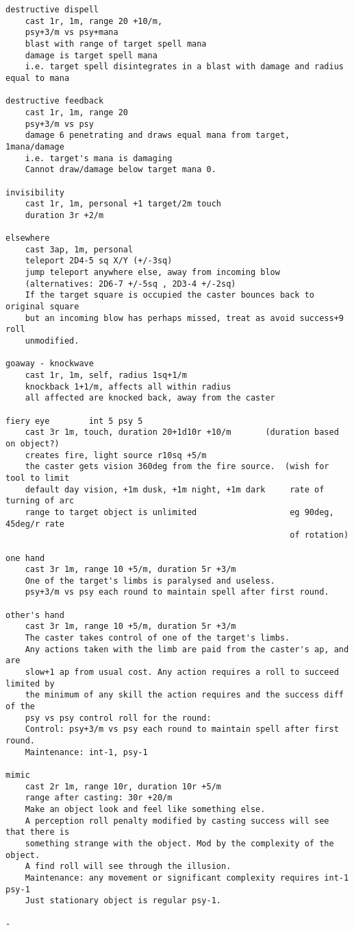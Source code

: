 \small \begin{verbatim}
destructive dispell
    cast 1r, 1m, range 20 +10/m, 
    psy+3/m vs psy+mana
    blast with range of target spell mana
    damage is target spell mana
    i.e. target spell disintegrates in a blast with damage and radius equal to mana

destructive feedback
    cast 1r, 1m, range 20
    psy+3/m vs psy
    damage 6 penetrating and draws equal mana from target, 1mana/damage
    i.e. target's mana is damaging
    Cannot draw/damage below target mana 0.

invisibility
    cast 1r, 1m, personal +1 target/2m touch
    duration 3r +2/m

elsewhere
    cast 3ap, 1m, personal
    teleport 2D4-5 sq X/Y (+/-3sq)
    jump teleport anywhere else, away from incoming blow
    (alternatives: 2D6-7 +/-5sq , 2D3-4 +/-2sq)
    If the target square is occupied the caster bounces back to original square
    but an incoming blow has perhaps missed, treat as avoid success+9 roll
    unmodified.

goaway - knockwave
    cast 1r, 1m, self, radius 1sq+1/m
    knockback 1+1/m, affects all within radius
    all affected are knocked back, away from the caster

fiery eye        int 5 psy 5
    cast 3r 1m, touch, duration 20+1d10r +10/m       (duration based on object?)
    creates fire, light source r10sq +5/m
    the caster gets vision 360deg from the fire source.  (wish for tool to limit
    default day vision, +1m dusk, +1m night, +1m dark     rate of turning of arc
    range to target object is unlimited                   eg 90deg, 45deg/r rate
                                                          of rotation)

one hand
    cast 3r 1m, range 10 +5/m, duration 5r +3/m
    One of the target's limbs is paralysed and useless.
    psy+3/m vs psy each round to maintain spell after first round.
    
other's hand
    cast 3r 1m, range 10 +5/m, duration 5r +3/m
    The caster takes control of one of the target's limbs.
    Any actions taken with the limb are paid from the caster's ap, and are
    slow+1 ap from usual cost. Any action requires a roll to succeed limited by
    the minimum of any skill the action requires and the success diff of the 
    psy vs psy control roll for the round:
    Control: psy+3/m vs psy each round to maintain spell after first round.
    Maintenance: int-1, psy-1

mimic
    cast 2r 1m, range 10r, duration 10r +5/m
    range after casting: 30r +20/m
    Make an object look and feel like something else.
    A perception roll penalty modified by casting success will see that there is
    something strange with the object. Mod by the complexity of the object.
    A find roll will see through the illusion.
    Maintenance: any movement or significant complexity requires int-1 psy-1
    Just stationary object is regular psy-1.

-

\end{verbatim} \normalsize


